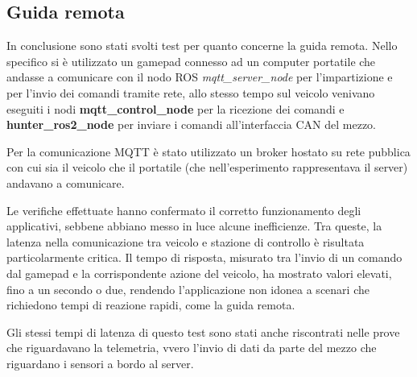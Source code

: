 \subsection{Guida remota}
In conclusione sono stati svolti test per quanto concerne la guida remota. Nello specifico si è utilizzato un gamepad connesso ad un computer portatile che andasse a comunicare con il nodo ROS \textit{mqtt\_server\_node} per l'impartizione e per l'invio dei comandi tramite rete, allo stesso tempo sul veicolo venivano eseguiti i nodi \textbf{mqtt\_control\_node} per la ricezione dei comandi e \textbf{hunter\_ros2\_node} per inviare i comandi all'interfaccia CAN del mezzo.

\noindent Per la comunicazione MQTT è stato utilizzato un broker hostato su rete pubblica con cui sia il veicolo che il portatile (che nell'esperimento rappresentava il server) andavano a comunicare. 

\noindent Le verifiche effettuate hanno confermato il corretto funzionamento degli applicativi, sebbene abbiano messo in luce alcune inefficienze. Tra queste, la latenza nella comunicazione tra veicolo e stazione di controllo è risultata particolarmente critica. Il tempo di risposta, misurato tra l'invio di un comando dal gamepad e la corrispondente azione del veicolo, ha mostrato valori elevati, fino a un secondo o due, rendendo l'applicazione non idonea a scenari che richiedono tempi di reazione rapidi, come la guida remota.

\noindent Gli stessi tempi di latenza di questo test sono stati anche riscontrati nelle prove che riguardavano la telemetria, vvero l'invio di dati da parte del mezzo che riguardano i sensori a bordo al server.
